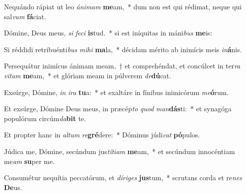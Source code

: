 \item Nequándo rápiat ut leo \textit{á}\textit{ni}\textit{mam} \textbf{me}am,~* dum non est qui rédimat, neque qui sal\textit{vum} \textbf{fá}ciat.
\item Dómine, Deus meus, \textit{si} \textit{fe}\textit{ci} \textbf{is}tud.~* si est iníquitas in máni\textit{bus} \textbf{me}is:
\item Si réddidi retribuénti\textit{bus} \textit{mi}\textit{hi} \textbf{ma}la,~* décidam mérito ab inimícis meis \textit{in}\textbf{á}nis.
\item Persequátur inimícus ánimam meam,~† et comprehéndat, et concúlcet in ter\textit{ra} \textit{vi}\textit{tam} \textbf{me}am,~* et glóriam meam in púlverem \textit{de}\textbf{dú}cat.
\item Exsúrge, Dómine, \textit{in} \textit{i}\textit{ra} \textbf{tu}a:~* et exaltáre in fínibus inimicórum \textit{me}\textbf{ó}rum.
\item Et exsúrge, Dómine Deus meus, in præcép\textit{to} \textit{quod} \textit{man}\textbf{dás}ti:~* et synagóga populórum circúm\textit{da}\textbf{bit} te.
\item Et propter hanc in \textit{al}\textit{tum} \textit{re}\textbf{gré}dere:~* Dóminus júdi\textit{cat} \textbf{pó}pulos.
\item Júdica me, Dómine, secúndum jus\textit{tí}\textit{ti}\textit{am} \textbf{me}am,~* et secúndum innocéntiam me\textit{am} \textbf{su}per me.
\item Consumétur nequítia peccatórum, et \textit{dí}\textit{ri}\textit{ges} \textbf{jus}tum,~* scrutans corda et re\textit{nes} \textbf{De}us.
